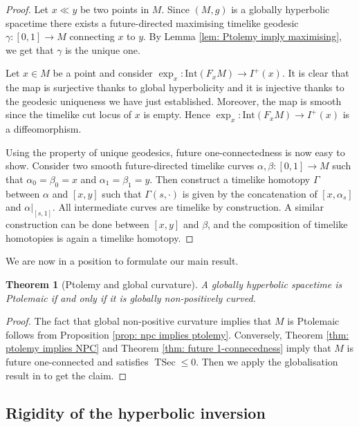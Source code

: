 \documentclass[hidelinks,12pt,a4paper]{article}
\numberwithin{equation}{section}
\theoremstyle{plain}
\newtheorem{theorem}[definition]{Theorem}
\theoremstyle{definition}
\newcommand{\Int}{\mathrm{Int}}
\DeclareMathOperator{\TSec}{TSec}
\begin{document}
\begin{proof}
Let $x \ll y$ be two points in $M$. Since $(M,g)$ is a globally hyperbolic spacetime  there exists a future-directed maximising timelike geodesic $\gamma : [0,1] \rightarrow M$ connecting $x$ to $y$. 
By Lemma \ref{lem: Ptolemy imply maximising}, we get that $\gamma$ is the unique one. 

Let $x \in M$ be a point and consider $\exp_x : \Int (F_xM) \rightarrow I^+(x)$. 
It is clear that the map is surjective thanks to global hyperbolicity and it is injective thanks to the geodesic uniqueness we have just established. 
Moreover, the map is smooth since the timelike cut locus of $x$ is empty. Hence $\exp_x : \Int (F_xM) \rightarrow I^+(x)$ is a diffeomorphism. 

Using the property of unique geodesics, future one-connectedness is now easy to show. 
Consider two smooth future-directed timelike curves $\alpha , \beta : [0,1] \rightarrow M$ such that $\alpha _0= \beta _0 = x$ and $\alpha _1 = \beta _1 = y$. 
Then construct a timelike homotopy $\Gamma$ between $\alpha$ and $[x,y]$ such that $\Gamma(s,\cdot)$ is given by the concatenation of $[x,\alpha_s]$ and $\alpha|_{[s,1]}$. 
All intermediate curves are timelike by construction. 
A similar construction can be done between $[x,y]$ and $\beta$, and the composition of timelike homotopies is again a timelike homotopy. 
\end{proof}

We are now in a position to formulate our main result. 

\begin{theorem}[Ptolemy and global curvature]
    A globally hyperbolic spacetime is Ptolemaic if and only if it is globally non-positively curved.
\end{theorem}

\begin{proof}
The fact that global non-positive curvature implies that $M$ is Ptolemaic follows from Proposition \ref{prop: npc implies ptolemy}. 
Conversely, Theorem \ref{thm: ptolemy implies NPC} and Theorem \ref{thm: future 1-connecedness} imply that $M$ is future one-connected and satisfies $\TSec \leq 0$. Then we apply the globalisation result in \cite[Corollary 4.9]{EG25+} to get the claim. 
\end{proof}

\subsection{Rigidity of the hyperbolic inversion}
\end{document}
